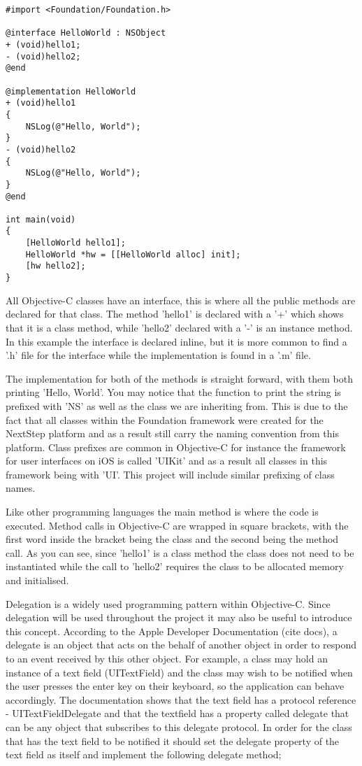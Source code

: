 \documentclass[12pt]{report}
\begin{document}
\begin{verbatim}
#import <Foundation/Foundation.h>

@interface HelloWorld : NSObject
+ (void)hello1;
- (void)hello2;
@end

@implementation HelloWorld
+ (void)hello1 
{
    NSLog(@"Hello, World");
}
- (void)hello2 
{
    NSLog(@"Hello, World");
}
@end

int main(void) 
{
    [HelloWorld hello1];
    HelloWorld *hw = [[HelloWorld alloc] init];
    [hw hello2];
}
\end{verbatim}

All Objective-C classes have an interface, this is where all the public methods are declared for that class. The method 'hello1' is declared with a '+' which shows that it is a class method, while 'hello2' declared with a '-' is an instance method. In this example the interface is declared inline, but it is more common to find a '.h' file for the interface while the implementation is found in a '.m' file. 

The implementation for both of the methods is straight forward, with them both printing 'Hello, World'. You may notice that the function to print the string is prefixed with 'NS' as well as the class we are inheriting from. This is due to the fact that all classes within the Foundation framework were created for the NextStep platform and as a result still carry the naming convention from this platform. Class prefixes are common in Objective-C for instance the framework for user interfaces on iOS is called 'UIKit' and as a result all classes in this framework being with 'UI'. This project will include similar prefixing of class names. 

Like other programming languages the main method is where the code is executed. Method calls in Objective-C are wrapped in square brackets, with the first word inside the bracket being the class and the second being the method call. As you can see, since 'hello1' is a class method the class does not need to be instantiated while the call to 'hello2' requires the class to be allocated memory and initialised.

Delegation is a widely used programming pattern within Objective-C. Since delegation will be used throughout the project it may also be useful to introduce this concept. According to the Apple Developer Documentation (cite docs), a delegate is an object that acts on the behalf of another object in order to respond to an event received by this other object. For example, a class may hold an instance of a text field (UITextField) and the class may wish to be notified when the user presses the enter key on their keyboard, so the application  can behave accordingly. The documentation shows that the text field has a protocol reference - UITextFieldDelegate and that the textfield has a property called delegate that can be any object that subscribes to this delegate protocol. In order for the class that has the text field to be notified it should set the delegate property of the text field as itself and implement the following delegate method;
\end{document}
